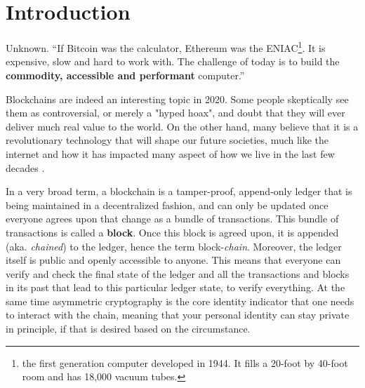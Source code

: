 \chapter{Introduction} \label{chap:intoroduction}

\ifpdf
    \graphicspath{{1_introduction/figures/PNG/}{1_introduction/figures/PDF/}{1_introduction/figures/}}
\else
    \graphicspath{{1_introduction/figures/EPS/}{1_introduction/figures/}}
\fi

\begin{chapquote}{Unknown.}
``If Bitcoin was the calculator, Ethereum was the ENIAC\footnote{the first generation computer
developed in 1944. It fills a 20-foot by 40-foot room and has 18,000 vacuum tubes.}. It is
expensive, slow and hard to work with. The challenge of today is to build the \textbf{commodity,
accessible and performant} computer.''
\end{chapquote}



Blockchains are indeed an interesting topic in 2020. Some people skeptically see them as
controversial, or merely a "hyped hoax", and doubt that they will ever deliver much real value to
the world. On the other hand, many believe that it is a revolutionary technology that will shape our
future societies, much like the internet and how it has impacted many aspect of how we live in the
last few decades \cite{will_blockchain_be_big_deal}. 

In a very broad term, a blockchain is a tamper-proof, append-only ledger that is being maintained in
a decentralized fashion, and can only be updated once everyone agrees upon that change as a bundle
of transactions. This bundle of transactions is called a \textbf{block}. Once this block is agreed
upon, it is appended (aka. \textit{chained}) to the ledger, hence the term block-\textit{chain}.
Moreover, the ledger itself is public and openly accessible to anyone. This means that everyone can
verify and check the final state of the ledger and all the transactions and blocks in its past that
lead to this particular ledger state, to verify everything. At the same time asymmetric cryptography
is the core identity indicator that one needs to interact with the chain, meaning that your personal
identity can stay private in principle, if that is desired based on the circumstance.

